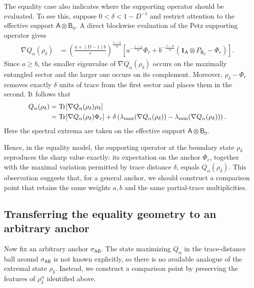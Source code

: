 \documentclass[11pt,reqno]{amsart}
\theoremstyle{definition}
\DeclareMathOperator{\Tr}{Tr}
\newcommand{\I}{\mathbf 1}
\newcommand{\A}{\mathsf{A}}
\newcommand{\B}{\mathsf{B}}
\begin{document}
The equality case also indicates where the supporting operator should be
evaluated.  To see this, suppose
$0<\delta<1-D^{-1}$ and restrict attention to the effective support
$\A\otimes\B_0$.  A direct blockwise evaluation of the Petz supporting operator gives
\begin{align}
	\nabla Q_{\alpha}(\rho_\delta)
	&=
	\left(
	\frac{a+(D-1)b}{r}
	\right)^{\frac{1-\alpha}{\alpha}}
	\left[
	a^{-\frac{1-\alpha}{\alpha}}\Phi_r
	+b^{-\frac{1-\alpha}{\alpha}}
	\left(
	\I_{\A}\otimes P_{\B_0}-\Phi_r
	\right)
	\right].
	\label{eq:isotropic-supporting-operator}
\end{align}
Since $a\geq b$, the smaller
eigenvalue of $\nabla Q_{\alpha}(\rho_\delta)$ occurs on the maximally entangled sector
and the larger one occurs on its complement.  Moreover,
$\rho_\delta-\Phi_r$ removes exactly $\delta$ units of trace from the
first sector and places them in the second.  It follows that
\begin{align}
	Q_\alpha(\rho_\delta)
	&=
	\Tr[\nabla Q_{\alpha}(\rho_\delta)\rho_\delta]
	\notag\\
	&=
	\Tr[\nabla Q_{\alpha}(\rho_\delta)\Phi_r]
	+\delta\left(
	\lambda_{\max}(\nabla Q_{\alpha}(\rho_\delta))
	-\lambda_{\min}(\nabla Q_{\alpha}(\rho_\delta))
	\right).
	\label{eq:isotropic-supporting-saturation}
\end{align}
Here the spectral extrema are taken on the effective support
$\A\otimes\B_0$.

Hence, in the equality model, the supporting operator at the boundary state
$\rho_\delta$ reproduces the sharp value exactly: its expectation on the
anchor $\Phi_r$, together with the maximal variation permitted by trace
distance $\delta$, equals $Q_\alpha(\rho_\delta)$.  This observation
suggests that, for a general anchor, we should construct a comparison point
that retains the same weights $a,b$ and the same partial-trace
multiplicities.

\subsection{Transferring the equality geometry to an arbitrary anchor}

Now fix an arbitrary anchor $\sigma_{\A\B}$.  The state maximizing
$Q_\alpha$ in the trace-distance ball around $\sigma_{\A\B}$ is not known
explicitly, so there is no available analogue of the extremal state
$\rho_\delta$.  Instead, we construct a comparison point by preserving the
features of $\rho_\delta^\alpha$ identified above.
\end{document}
